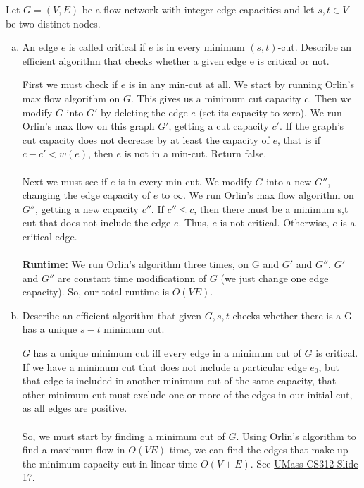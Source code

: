 \documentclass[11pt]{article}
\begin{document}



Let $G = (V, E)$ be a flow network with integer edge capacities and let $s, t \in V$ be two distinct
nodes.
\begin{enumerate}[(a)]
    \item An edge $e$ is called critical if $e$ is in every minimum $(s, t)$-cut. Describe an efficient
algorithm that checks whether a given edge e is critical or not.
    \begin{solution}
First we must check if $e$ is in any min-cut at all. We start by running Orlin's max flow algorithm on $G$.  This gives us a minimum cut capacity $c$. Then we modify $G$ into $G'$ by deleting the edge $e$ (set its capacity to zero). We run Orlin's max flow on this graph $G'$, getting a cut capacity $c'$. If the graph's cut capacity does not decrease by at least the capacity of $e$, that is if $c-c' < w(e)$, then $e$ is not in a min-cut. Return false. \\ \\ 
Next we must see if $e$ is in every min cut. We modify $G$ into a new $G''$, changing the edge capacity of $e$ to $\infty$. We run Orlin's max flow algorithm on $G''$, getting a new capacity $c''$. If $c'' \leq c$, then there must be a minimum s,t cut that does not include the edge $e$. Thus, $e$ is not critical. Otherwise, $e$ is a critical edge. \\ \\
\textbf{Runtime:} We run Orlin's algorithm three times, on G and $G'$ and $G''$. $G'$ and $G''$ are constant time modificationn of $G$ (we just change one edge capacity). So, our total runtime is $O(VE)$.
    \end{solution}
    \item Describe an efficient algorithm that given $G, s, t$ checks whether there is a G has a unique
$s-t$ minimum cut.
    \begin{solution}
$G$ has a unique minimum cut iff every edge in a minimum cut of $G$ is critical. If we have a minimum cut that does not include a particular edge $e_0$, but that edge is included in another minimum cut of the same capacity, that other minimum cut must exclude one or more of the edges in our initial cut, as all edges are positive. \\ \\
So, we must start by finding a minimum cut of $G$. Using Orlin's algorithm to find a maximum flow in $O(VE)$ time, we can find the edges that make up the minimum capacity cut in linear time $O(V+E)$. See \href{https://people.cs.umass.edu/~sheldon/teaching/mhc/cs312/2013sp/Slides/Slides20%20-%20Max-Flow%20Min-Cut.pdf}{UMass CS312 Slide 17}.  \\ \\

\end{solution}
\end{enumerate}
\end{document}
